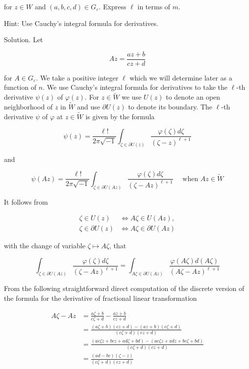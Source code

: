 \documentclass[10pt]{article}
\begin{document}
for $z \in W$ and $(a, b, c, d) \in G_{\varepsilon}$. Express $\ell$ in terms of $m$.

Hint: Use Cauchy's integral formula for derivatives.

Solution. Let

$$
A z=\frac{a z+b}{c z+d}
$$

for $A \in G_{\varepsilon}$. We take a positive integer $\ell$ which we will determine later as a function of $n$. We use Cauchy's integral formula for derivatives to take the $\ell$-th derivative $\psi(z)$ of $\varphi(z)$. For $z \in \tilde{W}$ we use $U(z)$ to denote an open
neighborhood of $z$ in $\tilde{W}$ and use $\partial U(z)$ to denote its boundary. The $\ell$-th derivative $\psi$ of $\varphi$ at $z \in \tilde{W}$ is given by the formula

$$
\psi(z)=\frac{\ell !}{2 \pi \sqrt{-1}} \int_{\zeta \in \partial U(z)} \frac{\varphi(\zeta) d \zeta}{(\zeta-z)^{\ell+1}}
$$

and

$$
\psi(A z)=\frac{\ell !}{2 \pi \sqrt{-1}} \int_{\zeta \in \partial U(A z)} \frac{\varphi(\zeta) d \zeta}{(\zeta-A z)^{\ell+1}} \quad \text { when } A z \in \tilde{W}
$$

It follows from

$$
\begin{aligned}
\zeta \in U(z) & \Longleftrightarrow A \zeta \in U(A z), \\
\zeta \in \partial U(z) & \Longleftrightarrow A \zeta \in \partial U(A z)
\end{aligned}
$$

with the change of variable $\zeta \mapsto A \zeta$, that

$$
\int_{\zeta \in \partial U(A z)} \frac{\varphi(\zeta) d \zeta}{(\zeta-A z)^{\ell+1}}=\int_{A \zeta \in \partial U(A z)} \frac{\varphi(A \zeta) d(A \zeta)}{(A \zeta-A z)^{\ell+1}}
$$

From the following straightforward direct computation of the discrete version of the formula for the derivative of fractional linear transformation

$$
\begin{aligned}
A \zeta-A z & =\frac{a \zeta+b}{c \zeta+d}-\frac{a z+b}{c z+d} \\
& =\frac{(a \zeta+b)(c z+d)-(a z+b)(c \zeta+d)}{(c \zeta+d)(c z+d)} \\
& =\frac{(a c \zeta z+b c z+a d \zeta+b d)-(a c \zeta z+a d z+b c \zeta+b d)}{(c \zeta+d)(c z+d)} \\
& =\frac{(a d-b c)(\zeta-z)}{(c \zeta+d)(c z+d)}
\end{aligned}
$$
\end{document}

